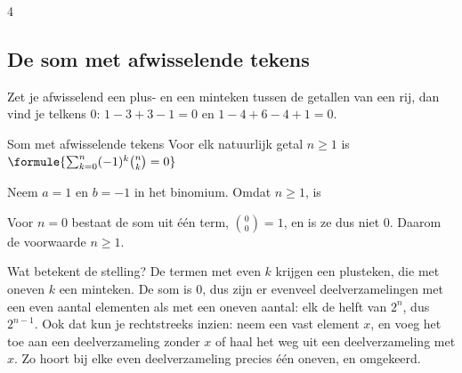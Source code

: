 \begin{alleenvoor}{4}
\subsection{De som met afwisselende tekens}

Zet je afwisselend een plus- en een minteken tussen de getallen van een rij, dan vind je telkens 0: $1 - 3 + 3 - 1 = 0$ en $1 - 4 + 6 - 4 + 1 = 0$.

\begin{theorie}
\begin{stelling}{Som met afwisselende tekens}
Voor elk natuurlijk getal $n \geqslant 1$ is \quad $\formule{\sum_{k=0}^{n} (-1)^k \binom{n}{k} = 0}$
\end{stelling}

\begin{bewijs}
Neem $a = 1$ en $b = -1$ in het binomium. Omdat $n \geqslant 1$, is
\end{bewijs}
\end{theorie}

Voor $n = 0$ bestaat de som uit één term, $\binom00 = 1$, en is ze dus niet 0. Daarom de voorwaarde $n \geqslant 1$.

Wat betekent de stelling? De termen met even $k$ krijgen een plusteken, die met oneven $k$ een minteken. De som is 0, dus zijn er evenveel deelverzamelingen met een even aantal elementen als met een oneven aantal: elk de helft van $2^n$, dus $2^{n - 1}$. Ook dat kun je rechtstreeks inzien: neem een vast element $x$, en voeg het toe aan een deelverzameling zonder $x$ of haal het weg uit een deelverzameling met $x$. Zo hoort bij elke even deelverzameling precies één oneven, en omgekeerd.


\begin{oefeningen}

\end{oefeningen}
\end{alleenvoor}

